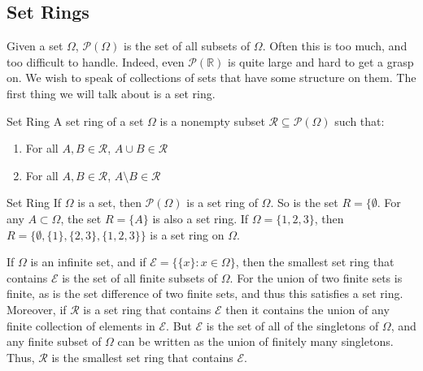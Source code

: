 \documentclass[crop=false,class=book,oneside]{standalone}
\begin{document}
        \subsection{Set Rings}
            Given a set $\Omega$, $\mathcal{P}(\Omega)$ is the
            set of all subsets of $\Omega$. Often this is too
            much, and too difficult to handle. Indeed, even
            $\mathcal{P}(\mathbb{R})$ is quite large and hard
            to get a grasp on. We wish to speak of collections
            of sets that have some structure on them.
            The first thing we will talk about is a set ring.
            \begin{ldefinition}{Set Ring}
                A set ring of a set $\Omega$ is a nonempty subset
                $\mathcal{R}\subseteq\mathcal{P}(\Omega)$ such that:
                \begin{enumerate}
                    \item For all $A,B\in\mathcal{R}$,
                          $A\cup{B}\in\mathcal{R}$
                    \item For all $A,B\in\mathcal{R}$,
                          $A\setminus{B}\in\mathcal{R}$
                \end{enumerate}
            \end{ldefinition}
            \begin{example}{Set Ring}
                If $\Omega$ is a set, then
                $\mathcal{P}(\Omega)$ is a set ring of
                $\Omega$. So is the set $R=\{\emptyset$.
                For any $A\subset\Omega$, the set
                $R=\{A\}$ is also a set ring. If
                $\Omega=\{1,2,3\}$, then
                $R=\{\emptyset,\{1\},\{2,3\},\{1,2,3\}\}$ is
                a set ring on $\Omega$.
            \end{example}
            \begin{lexample}
                If $\Omega$ is an infinite set, and if
                $\mathcal{E}=\big\{\{x\}:x\in\Omega\big\}$, then the
                smallest set ring that contains $\mathcal{E}$ is the set of
                all finite subsets of $\Omega$. For the union of two finite
                sets is finite, as is the set difference of two finite sets,
                and thus this satisfies a set ring. Moreover, if $\mathcal{R}$
                is a set ring that contains $\mathcal{E}$ then it contains the
                union of any finite collection of elements in $\mathcal{E}$.
                But $\mathcal{E}$ is the set of all of the singletons of
                $\Omega$, and any finite subset of $\Omega$ can be written
                as the union of finitely many singletons. Thus, $\mathcal{R}$
                is the smallest set ring that contains $\mathcal{E}$.
            \end{lexample}
\end{document}
